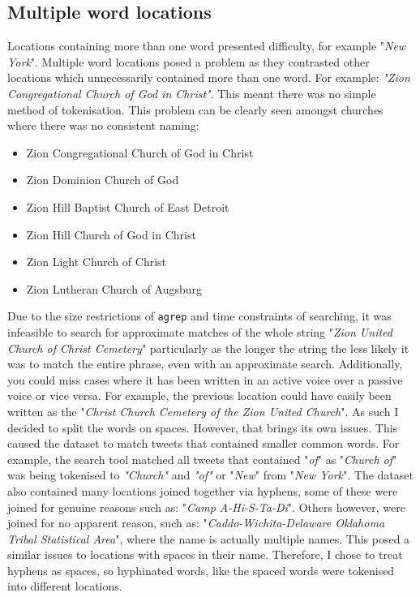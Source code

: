 \documentclass[a4paper]{article}
\begin{document}
\subsection{Multiple word locations}
Locations containing more than one word presented difficulty, for example "\textit{New York}". Multiple word locations posed a problem as they contrasted other locations which unnecessarily contained more than one word. For example: \textit{"Zion Congregational Church of God in Christ"}. This meant there was no simple method of tokenisation. This problem can be clearly seen amongst churches where there was no consistent naming:
\begin{itemize}
  \item Zion Congregational Church of God in Christ
  \item Zion Dominion Church of God
  \item Zion Hill Baptist Church of East Detroit
  \item Zion Hill Church of God in Christ
  \item Zion Light Church of Christ
  \item Zion Lutheran Church of Augsburg
\end{itemize}


Due to the size restrictions of \texttt{agrep} and time constraints of searching, it was infeasible to search for approximate matches of the whole string "\textit{Zion United Church of Christ Cemetery}" particularly as the longer the string the less likely it was to match the entire phrase, even with an approximate search. Additionally, you could miss cases where it has been written in an active voice over a passive voice or vice versa. For example, the previous location could have easily been written as the "\textit{Christ Church Cemetery of the Zion United Church}". As such I decided to split the words on spaces. However, that brings its own issues. This caused the dataset to match tweets that contained smaller common words. For example, the search tool matched all tweets that contained  "\textit{of}" as  "\textit{Church of}"  was being tokenised to \textit{"Church"} and \textit{"of"} or "\textit{New}" from "\textit{New York}".
The dataset also contained many locations joined together via hyphens, some of these were joined for genuine reasons such as: "\textit{Camp A-Hi-S-Ta-Di}". Others however, were joined for no apparent reason, such as: "\textit{Caddo-Wichita-Delaware Oklahoma Tribal Statistical Area}", where the name is actually multiple names. This posed a similar issues to locations with spaces in their name. Therefore, I chose to treat hyphens as spaces, so hyphinated words, like the spaced words were tokenised into different locations.
\end{document}
